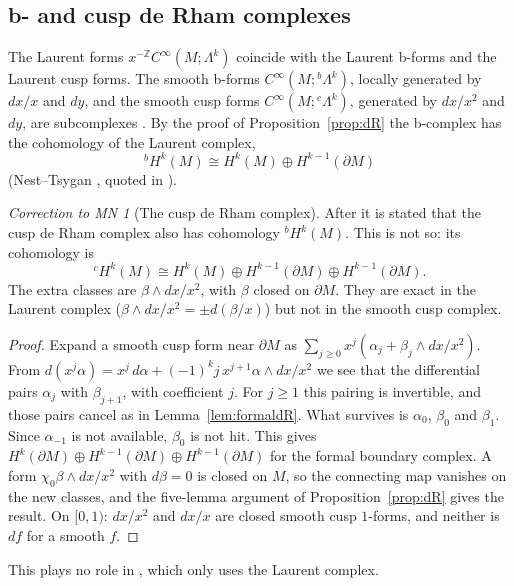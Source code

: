 \documentclass[11pt,oneside,reqno]{article}
\newcommand{\Z}{\mathbb Z}
\newcommand{\CI}{C^\infty}
\theoremstyle{plain}
\theoremstyle{definition}
\theoremstyle{remark}
\newtheorem{correction}[theorem]{Correction to MN}
\begin{document}
\subsection{b- and cusp de Rham complexes}
The Laurent forms \(x^{-\Z}\CI(M;\Lambda^k)\) coincide with the Laurent
b-forms and the Laurent cusp forms. The smooth b-forms \(\CI(M;{}^b\Lambda^k)\),
locally generated by \(dx/x\) and \(dy\), and the smooth cusp forms
\(\CI(M;{}^c\Lambda^k)\), generated by \(dx/x^2\) and \(dy\), are
subcomplexes \cite[(32)--(33)]{MN}. By the proof of
Proposition~\ref{prop:dR} the b-complex has the cohomology of the Laurent
complex,
\[
 {}^bH^k(M)\cong H^k(M)\oplus H^{k-1}(\partial M)
\]
(Nest--Tsygan \cite{NestTsyganBoundary}, quoted in \cite{MN}).

\begin{correction}[The cusp de Rham complex]\label{corr:cdR}
After \cite[(33)]{MN} it is stated that the cusp de Rham complex also has
cohomology \({}^bH^k(M)\). This is not so: its cohomology is
\[
 {}^cH^k(M)\cong H^k(M)\oplus H^{k-1}(\partial M)\oplus H^{k-1}(\partial M).
\]
The extra classes are \(\beta\wedge dx/x^2\), with \(\beta\) closed on
\(\partial M\). They are exact in the Laurent complex
(\(\beta\wedge dx/x^2=\pm d(\beta/x)\)) but not in the smooth cusp
complex.
\end{correction}

\begin{proof}
Expand a smooth cusp form near \(\partial M\) as
\(\sum_{j\ge0}x^j(\alpha_j+\beta_j\wedge dx/x^2)\). From
\(d(x^j\alpha)=x^j\,d\alpha+(-1)^kj\,x^{j+1}\alpha\wedge dx/x^2\) we see that
the differential pairs \(\alpha_j\) with \(\beta_{j+1}\), with coefficient
\(j\). For \(j\ge1\) this pairing is invertible, and those pairs cancel as
in Lemma~\ref{lem:formaldR}. What survives is \(\alpha_0\), \(\beta_0\)
and \(\beta_1\). Since \(\alpha_{-1}\) is not available, \(\beta_0\) is
not hit. This gives \(H^k(\partial M)\oplus H^{k-1}(\partial M)\oplus
H^{k-1}(\partial M)\) for the formal boundary complex. A form
\(\chi_0\beta\wedge dx/x^2\) with \(d\beta=0\) is closed on \(M\), so the
connecting map vanishes on the new classes, and the five-lemma argument of
Proposition~\ref{prop:dR} gives the result. On \([0,1)\): \(dx/x^2\) and
\(dx/x\) are closed smooth cusp \(1\)-forms, and neither is \(df\) for a
smooth \(f\).
\end{proof}

This plays no role in \cite{MN}, which only uses the Laurent complex.
\end{document}

